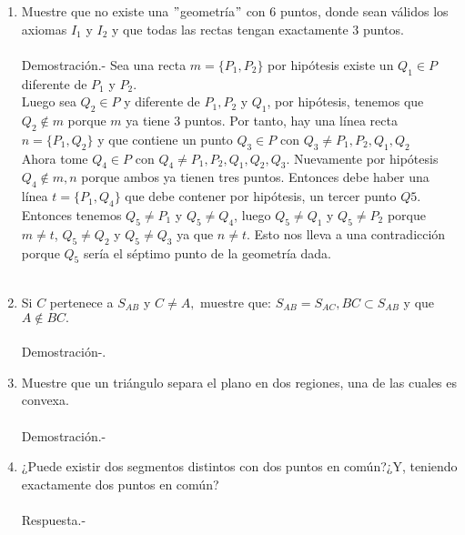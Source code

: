 \documentclass[10pt]{article}
\begin{document}
\begin{enumerate}
    \item Muestre que no existe una $"$geometría$"$ con $6$ puntos, donde sean válidos los axiomas $I_1$ y $I_2$ y que todas las rectas tengan exactamente $3$ puntos.\\\\   
    Demostración.-\; Sea una recta $m=\lbrace P_1,P_2 \rbrace$ por hipótesis existe un $Q_1 \in P$ diferente de $P_1$ y $P_2$.\\
    Luego sea $Q_2 \in P$ y diferente de $P_1,P_2$ y $Q_1$, por hipótesis, tenemos que $Q_2 \notin m$ porque $m$ ya tiene 3 puntos. Por tanto, hay una línea recta $n=\lbrace P_1,Q_2 \rbrace$ y que contiene un punto $Q_3\in P$ con $Q_3\neq P_1,P_2,Q_1,Q_2$\\
    Ahora tome $Q_4 \in P$ con $Q_4 \neq P_1,P_2,Q_1, Q_2,Q_3$. Nuevamente por hipótesis $Q_4 \notin m,n$ porque ambos ya tienen tres puntos. Entonces debe haber una línea $t=\lbrace P_1,Q_4 \rbrace$ que debe contener por hipótesis, un tercer punto $Q5$. Entonces tenemos $Q_5 \neq P_1$ y $Q_5 \neq Q_4$, luego $Q_5 \neq Q_1$ y $Q_5\neq P_2$ porque $m\neq t$, $Q_5\neq Q_2$ y $Q_5\neq Q_3$ ya que $n\neq t$. Esto nos lleva a una contradicción porque $Q_5$ sería el séptimo punto de la geometría dada.\\\\

    \item Si $C$ pertenece a $S_{AB}$ y $C\neq A,$ muestre que: $S_{AB}=S_{AC}, BC \subset S_{AB}$ y que $A \notin BC.$\\\\
    Demostración-.\;

    \item Muestre que un triángulo separa el plano en dos regiones, una de las cuales es convexa.\\\\
    Demostración.-\;

    \item ¿Puede existir dos segmentos distintos con dos puntos en común?¿Y, teniendo exactamente dos puntos en común?\\\\
    Respuesta.-\;

\end{enumerate}
\end{document}
